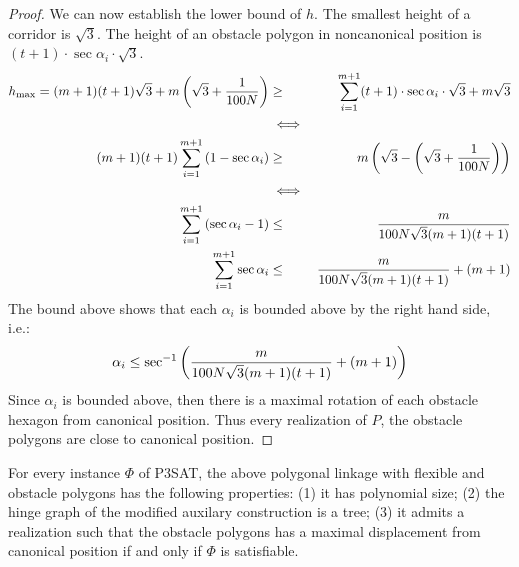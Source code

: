\begin{proof}
We can now establish the lower bound of $h$. 
The smallest height of a corridor is $\sqrt{3}$.
The height of an obstacle polygon in noncanonical position is $(t+1) \cdot \sec \alpha_i \cdot \sqrt{3}$.  
\begin{eqnarray*}
h_\text{max} = (m+1) (t+1) \sqrt{3} + m \left( \sqrt{3}+ \frac{1}{100N} \right)&\geq& \sum_{i = 1}^{m+1} (t+1) \cdot \sec \alpha_i \cdot \sqrt{3} + m \sqrt{3}\\
&\iff&\\
(m+1) (t+1) \sum_{i = 1}^{m+1} \left( 1 - \sec \alpha_i \right)&\geq& m \left( \sqrt{3} - \left( \sqrt{3}+ \frac{1}{100N} \right) \right)\\
&\iff&\\
\sum_{i = 1}^{m+1} \left(  \sec \alpha_i - 1 \right) &\leq& \frac{m}{100 N \sqrt{3} (m+1)(t+1) }\\
\sum_{i = 1}^{m+1}  \sec \alpha_i &\leq& \frac{m}{100 N \sqrt{3} (m+1)(t+1) } + (m+1)
\end{eqnarray*}
The bound above shows that each $\alpha_i$ is bounded above by the right hand side, i.e.:
\begin{equation}\label{eqn:alphaBound}
\alpha_i \leq \sec^{-1} \left( \frac{m}{100 N \sqrt{3} (m+1)(t+1) } + (m+1) \right)
\end{equation}
Since $\alpha_i$ is bounded above, then there is a maximal rotation of each obstacle hexagon from canonical position.
Thus every realization of $P$, the obstacle polygons are close to canonical position.

\end{proof}
\begin{lem}\label{lem:aux-B}
For every instance $\Phi$ of P3SAT, the above polygonal linkage with flexible and obstacle polygons has the following properties: (1) it has polynomial size; (2) the hinge graph of the modified auxilary construction is a tree;
(3) it admits a realization such that the obstacle polygons has a maximal displacement from canonical position if and only if $\Phi$ is satisfiable.
\end{lem}

